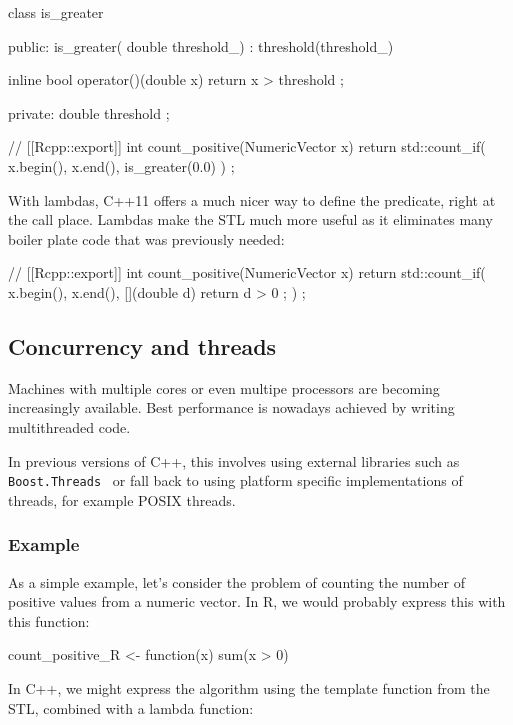 \begin{example}
class is_greater {
public:
  is_greater( double threshold_) : threshold(threshold_){}
  
  inline bool operator()(double x){
    return x > threshold ;
  }
  
private:
  double threshold ;
}
// [[Rcpp::export]]
int count_positive(NumericVector x){
  return std::count_if( x.begin(), x.end(), is_greater(0.0) ) ;
}
\end{example}

With lambdas, C++11 offers a much nicer way to define the predicate, right at the 
call place. Lambdas make the STL much more useful as it eliminates 
many boiler plate code that was previously needed:

\begin{example}
// [[Rcpp::export]]
int count_positive(NumericVector x){
  return std::count_if( x.begin(), x.end(), 
    [](double d){ return d > 0 ;}
  ) ;
}
\end{example}

\subsection{Concurrency and threads}

Machines with multiple cores or even multipe 
processors are becoming increasingly available. Best performance 
is nowadays achieved by writing multithreaded code. 

In previous versions of C++, this involves using external libraries 
such as \texttt{Boost.Threads}~\citep{KempfBoostThreads} 
or fall back to using platform specific 
implementations of threads, for example POSIX threads. 

\subsubsection{Example}

As a simple example, let's consider the problem of counting the number
of positive values from a numeric vector. In R, we would probably express this
with this function: 

\begin{example}
count_positive_R <- function(x){
  sum(x > 0)
}
\end{example}

In C++, we might express the algorithm using the  template
function from the STL, combined with a lambda function:

